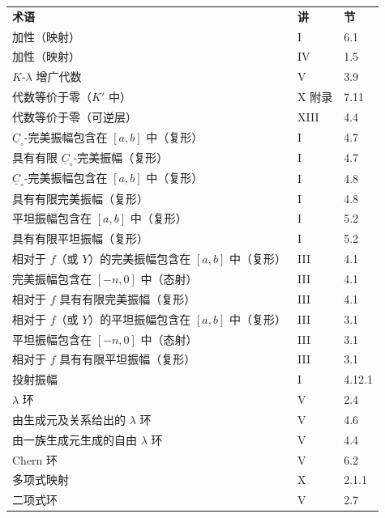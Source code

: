 \begin{longtable}{p{}ll}
\textbf{术语}&\textbf{讲}&\textbf{节}\\
加性（映射）&I&6.1\\
加性（映射）&IV&1.5\\
$K$-$\lambda$ 增广代数&V&3.9\\
代数等价于零（$K'$ 中）&X 附录&7.11\\
代数等价于零（可逆层）&XIII&4.4\\
$\underline C_\circ$-完美振幅包含在 $[a,b]$ 中（复形）&I&4.7\\
具有有限 $\underline C_\circ$-完美振幅（复形）&I&4.7\\
$\underline C_\circ$-完美振幅包含在 $[a,b]$ 中（复形）&I&4.8\\
具有有限完美振幅（复形）&I&4.8\\
平坦振幅包含在 $[a,b]$ 中（复形）&I&5.2\\
具有有限平坦振幅（复形）&I&5.2\\
相对于 $f$（或 $Y$）的完美振幅包含在 $[a,b]$ 中（复形）&III&4.1\\
完美振幅包含在 $[-n,0]$ 中（态射）&III&4.1\\
相对于 $f$ 具有有限完美振幅（复形）&III&4.1\\
相对于 $f$（或 $Y$）的平坦振幅包含在 $[a,b]$ 中（复形）&III&3.1\\
平坦振幅包含在 $[-n,0]$ 中（态射）&III&3.1\\
相对于 $f$ 具有有限平坦振幅（复形）&III&3.1\\
投射振幅&I&4.12.1\\
$\lambda$ 环&V&2.4\\
由生成元及关系给出的 $\lambda$ 环&V&4.6\\
由一族生成元生成的自由 $\lambda$ 环&V&4.4\\
Chern 环&V&6.2\\
多项式映射&X&2.1.1\\
二项式环&V&2.7\\
\end{longtable}


